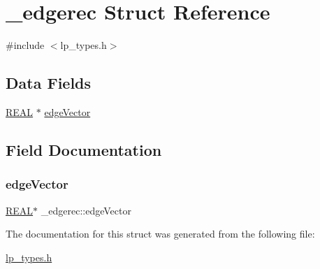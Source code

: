 \hypertarget{struct__edgerec}{}\section{\+\_\+edgerec Struct Reference}
\label{struct__edgerec}


{\ttfamily \#include $<$lp\+\_\+types.\+h$>$}

\subsection*{Data Fields}
\begin{DoxyCompactItemize}
\item 
\hyperlink{lp__lib_8h_a92bd5e363d131fa73669358edb232dce}{R\+E\+AL} $\ast$ \hyperlink{struct__edgerec_a7cc51eb3faaf581a78625fcb39aa3275}{edge\+Vector}
\end{DoxyCompactItemize}


\subsection{Field Documentation}
\mbox{\label{struct__edgerec_a7cc51eb3faaf581a78625fcb39aa3275}} 
\subsubsection{\texorpdfstring{edge\+Vector}{edgeVector}}
{\footnotesize\ttfamily \hyperlink{lp__lib_8h_a92bd5e363d131fa73669358edb232dce}{R\+E\+AL}$\ast$ \+\_\+edgerec\+::edge\+Vector}



The documentation for this struct was generated from the following file\+:\begin{DoxyCompactItemize}
\item 
\hyperlink{lp__types_8h}{lp\+\_\+types.\+h}\end{DoxyCompactItemize}
